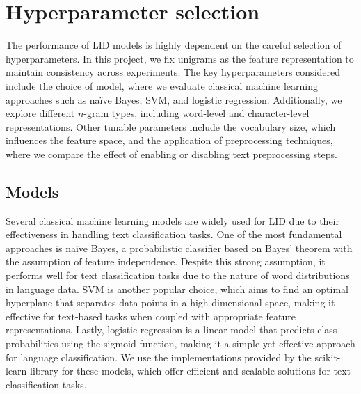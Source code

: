 \section{Hyperparameter selection}
The performance of LID models is highly dependent on the careful selection of hyperparameters. In this project, we fix unigrams as the feature representation to maintain consistency across experiments. The key hyperparameters considered include the choice of model, where we evaluate classical machine learning approaches such as naïve Bayes, SVM, and logistic regression. Additionally, we explore different $n$-gram types, including word-level and character-level representations. Other tunable parameters include the vocabulary size, which influences the feature space, and the application of preprocessing techniques, where we compare the effect of enabling or disabling text preprocessing steps.

\subsection{Models}
Several classical machine learning models are widely used for LID due to their effectiveness in handling text classification tasks. One of the most fundamental approaches is naïve Bayes, a probabilistic classifier based on Bayes' theorem with the assumption of feature independence. Despite this strong assumption, it performs well for text classification tasks due to the nature of word distributions in language data. SVM is another popular choice, which aims to find an optimal hyperplane that separates data points in a high-dimensional space, making it effective for text-based tasks when coupled with appropriate feature representations. Lastly, logistic regression is a linear model that predicts class probabilities using the sigmoid function, making it a simple yet effective approach for language classification. We use the implementations provided by the scikit-learn library for these models, which offer efficient and scalable solutions for text classification tasks. \cite{Hand2001, Cortes1995,cox1958regression}

